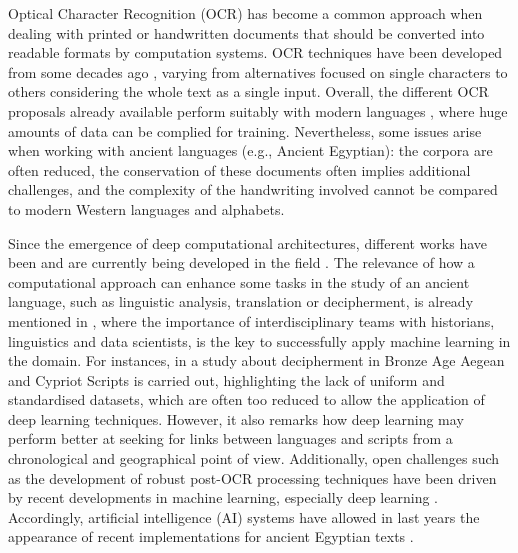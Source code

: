\documentclass[10pt,onecolumn,letterpaper]{article}
\begin{document}
Optical Character Recognition (OCR)  has become a common approach when dealing with printed or handwritten documents that should be converted into readable formats by computation systems. OCR techniques have been developed from some decades ago \cite{Mori92}, varying from alternatives focused on single characters to others considering the whole text as a single input. Overall, the different OCR proposals already available perform suitably with modern languages \cite{Memon20}, where huge amounts of data can be complied for training. Nevertheless, some issues arise when working with ancient languages (e.g., Ancient Egyptian): the corpora are often reduced, the conservation of these documents often implies additional challenges, and the complexity of the handwriting involved cannot be compared to modern Western languages and alphabets. 

Since the emergence of deep computational architectures, different works have been and are currently being developed in the field \cite{sproat2010}. The relevance of how a computational approach can enhance some tasks in the study of an ancient language, such as linguistic analysis, translation or decipherment, is already mentioned in \cite{sommerschield2023}, where the importance of interdisciplinary teams with historians, linguistics and data scientists, is the key to successfully apply machine learning in the domain. For instances, in \cite{braovic2024} a study about decipherment in Bronze Age Aegean and Cypriot Scripts is carried out, highlighting the lack of uniform and standardised datasets, which are often too reduced to allow the application of deep learning techniques. However, it also remarks how deep learning may perform better at seeking for links between languages and scripts from a chronological and geographical point of view. Additionally, open challenges such as the development of robust post-OCR processing techniques have been driven by recent developments in machine learning, especially deep learning \cite{Nguyen21}. Accordingly, artificial intelligence (AI) systems have allowed in last years the appearance of recent implementations for ancient Egyptian texts \cite{rosmorduc2015, zamacona2021, lucarelli2023, fuentes2025, KE2025, WANG2021}.
\end{document}
